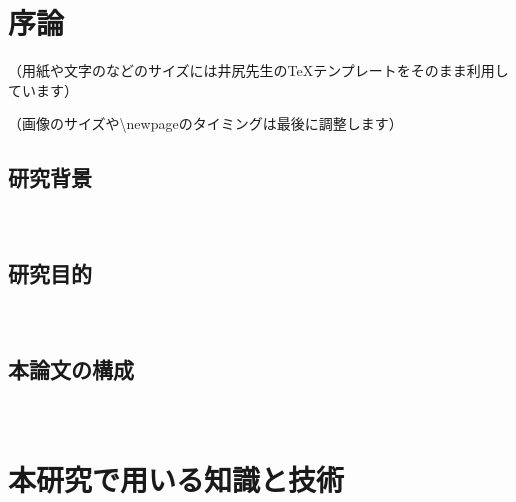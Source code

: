 \documentclass[12pt,a4j]{jreport}
\begin{document}



\chapter{序論}

（用紙や文字のなどのサイズには井尻先生のTeXテンプレートをそのまま利用しています）

（画像のサイズや\textbackslash newpageのタイミングは最後に調整します）

\section{研究背景}
~

\section{研究目的}
~

\section{本論文の構成}
~

\chapter{本研究で用いる知識と技術}
\end{document}
